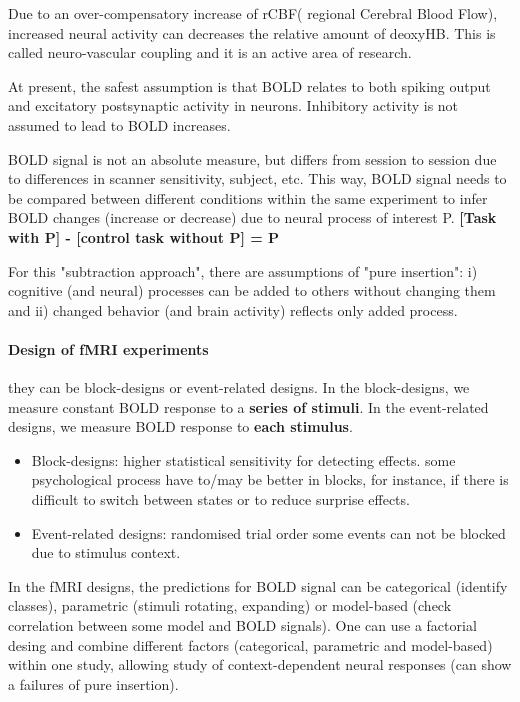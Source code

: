 \documentclass[12pt,article,oneside,a4paper]{memoir}
\begin{document}
Due to an over-compensatory increase of rCBF( regional Cerebral Blood Flow), increased neural activity can decreases the relative amount of deoxyHB. This is called neuro-vascular coupling and it is an active area of research.

At present, the safest assumption is that BOLD relates to both spiking output and excitatory postsynaptic activity in neurons. Inhibitory activity is not assumed to lead to BOLD increases.

BOLD signal is not an absolute measure, but differs from session to session due to differences in scanner sensitivity, subject, etc. This way, BOLD signal needs to be compared between different conditions within the same experiment to infer BOLD changes (increase or decrease) due to neural process of interest P. \textbf{[Task with P] - [control task without P] = P}

For this "subtraction approach", there are assumptions of "pure insertion": i) cognitive (and neural) processes can be added to others without changing them and ii) changed behavior (and brain activity) reflects only added process.

\paragraph{Design of fMRI experiments} they can be block-designs or event-related designs. In the block-designs, we measure constant BOLD response to a \textbf{series of stimuli}. In the event-related designs, we measure BOLD response to \textbf{each stimulus}.

\begin{itemize}
\item Block-designs:
\subitem higher statistical sensitivity for detecting effects.
\subitem some psychological process have to/may be better in blocks, for instance, if there is difficult to switch between states or to reduce surprise effects.
\item Event-related designs:
\subitem randomised trial order
\subitem some events can not be blocked due to stimulus context.
\end{itemize}

In the fMRI designs, the predictions for BOLD signal can be categorical (identify classes), parametric (stimuli rotating, expanding) or model-based (check correlation between some model and BOLD signals). One can use a factorial desing and combine different factors (categorical, parametric and model-based) within one study, allowing study of context-dependent neural responses (can show a failures of pure insertion).
\end{document}
